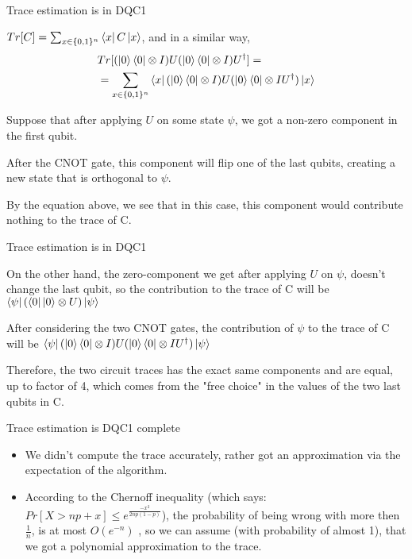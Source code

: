 \documentclass[leqno,fleqn]{beamer}
\begin{document}
\begin{frame}[label=sec-2-4]{Trace estimation is in DQC1}
\begin{block}{}
\(Tr[C] = \sum_{x \in \{0,1\}^n} \left\langle{x}\right\vert C\left\vert{x}\right\rangle\), and in a similar way,
\begin{align*}
&Tr[(\left\vert{0}\right\rangle\left\langle{0}\right\vert \otimes I)U(\left\vert{0}\right\rangle\left\langle{0}\right\vert \otimes I)U^\dagger] = \\
&= \sum_{x \in \{0,1\}^n} \left\langle{x}\right\vert(\left\vert{0}\right\rangle\left\langle{0}\right\vert\otimes I)U(\left\vert{0}\right\rangle\left\langle{0}\right\vert\otimes I{U^\dagger})\left\vert{x}\right\rangle
\end{align*}
\end{block}
\begin{block}{}
Suppose that after applying \(U\) on some state \(\psi\), we got a non-zero component in the first qubit.
\end{block}
\begin{block}{}
After the CNOT gate, this component will flip one of the last qubits, creating a new state that is orthogonal to \(\psi\).
\end{block}
\begin{block}{}
By the equation above, we see that in this case, this component would contribute nothing to the trace of C.
\end{block}
\end{frame}
\begin{frame}[label=sec-2-5]{Trace estimation is in DQC1}
\begin{block}{}
On the other hand, the zero-component we get after applying \(U\) on \(\psi\), doesn't change the last qubit, so the contribution to the trace of C will be \(\left\langle{\psi}\right\vert(\left\langle{0}\right\vert\left\vert{0}\right\rangle \otimes U)\left\vert{\psi}\right\rangle\)
\end{block}
\begin{block}{}
After considering the two CNOT gates, the contribution of \(\psi\) to the trace of C will be \(\left\langle{\psi}\right\vert(\left\vert{0}\right\rangle\left\langle{0}\right\vert\otimes I)U(\left\vert{0}\right\rangle\left\langle{0}\right\vert\otimes I{U^\dagger})\left\vert{\psi}\right\rangle\)
\end{block}
\begin{block}{}
Therefore, the two circuit traces has the exact same components and are equal, up to factor of 4, which comes from the "free choice" in the values of the two last qubits in C.
\end{block}
\end{frame}
\begin{frame}[label=sec-2-6]{Trace estimation is DQC1 complete}
\begin{itemize}
\item We didn't compute the trace accurately, rather got an approximation via the expectation of the algorithm.
\item According to the Chernoff inequality (which says: $Pr[X > np +x] \leq e^{\frac{-x^{2}}{2np(1-p)}}$), the probability of being wrong with more then $\frac{1}{n}$, is at most $O(e^{-n})$
, so we can assume (with probability of almost 1), that we got a polynomial approximation to the trace.
\end{itemize}
\end{frame}
\end{document}
